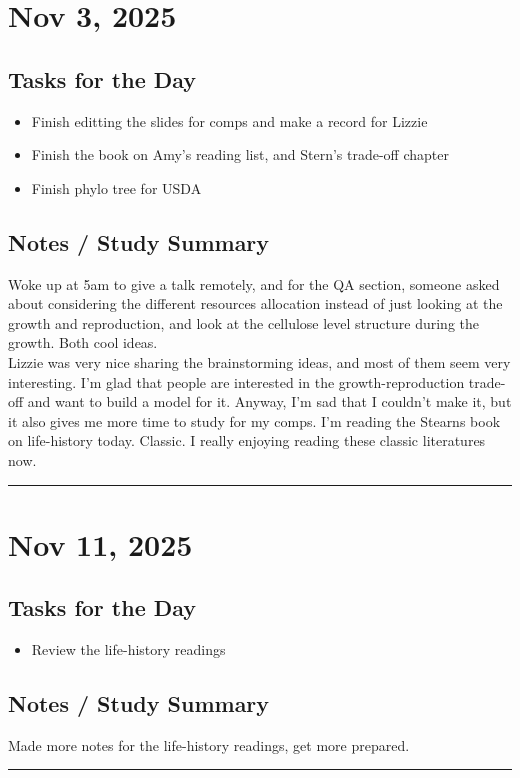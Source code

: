 \documentclass[12pt]{article}
\begin{document}
\section*{Nov 3, 2025}

\subsection*{Tasks for the Day}
\begin{itemize}
    \item Finish editting the slides for comps and make a record for Lizzie
    \item Finish the book on Amy's reading list, and Stern's trade-off chapter
    \item Finish phylo tree for USDA
\end{itemize}
\subsection*{Notes / Study Summary}
Woke up at 5am to give a talk remotely, and for the QA section, someone asked about considering the different resources allocation instead of just looking at the growth and reproduction, and look at the cellulose level structure during the growth. Both cool ideas.\\Lizzie was very nice sharing the brainstorming ideas, and most of them seem very interesting. I'm glad that people are interested in the growth-reproduction trade-off and want to build a model for it. Anyway, I'm sad that I couldn't make it, but it also gives me more time to study for my comps. I'm reading the Stearns book on life-history today. Classic. I really enjoying reading these classic literatures now.
\vspace{1em}
\hrule
\vspace{1em}
\section*{Nov 11, 2025}

\subsection*{Tasks for the Day}
\begin{itemize}
    \item Review the life-history readings
\end{itemize}
\subsection*{Notes / Study Summary}
Made more notes for the life-history readings, get more prepared.
\vspace{1em}
\hrule
\vspace{1em}
\end{document}
